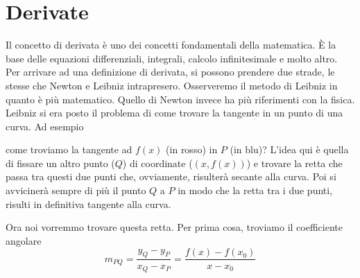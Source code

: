 
\section{Derivate}\label{sec:derivate}

Il concetto di derivata è uno dei concetti fondamentali della matematica. È la base delle equazioni
differenziali, integrali, calcolo infinitesimale e molto altro.\\
Per arrivare ad una definizione di derivata, si possono prendere due strade, le stesse che Newton e 
Leibniz intrapresero. Osserveremo il metodo di Leibniz in quanto è più matematico. Quello di Newton
invece ha più riferimenti con la fisica.\\
Leibniz si era posto il problema di come trovare la tangente in un punto di una curva. Ad esempio
\begin{center}
\end{center}
come troviamo la tangente ad $f(x)$ (in rosso) in $P$ (in blu)? L'idea qui è quella di fissare un
altro punto ($Q$) di coordinate ($(x,f(x))$) e trovare la retta che passa tra questi due punti che,
ovviamente, risulterà secante alla curva. Poi si avvicinerà sempre di più il punto $Q$ a $P$ in modo
che la retta tra i due punti, risulti in definitiva tangente alla curva.
\begin{center}
\end{center}
Ora noi vorremmo trovare questa retta. Per prima cosa, troviamo il coefficiente angolare
\begin{equation*}
  m_{PQ} = \frac{y_Q-y_P}{x_Q-x_P} = \frac{f(x)-f(x_0)}{x-x_0}
\end{equation*}
